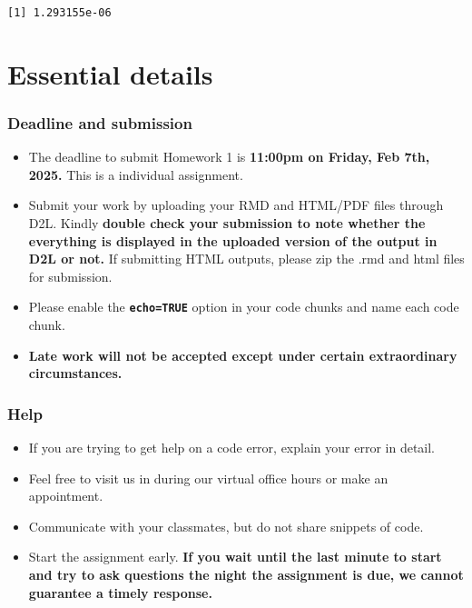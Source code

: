 \documentclass[
]{article}
\begin{document}
\begin{verbatim}
[1] 1.293155e-06
\end{verbatim}

\section{Essential details}\label{essential-details}

\subsubsection{Deadline and submission}\label{deadline-and-submission}

\begin{itemize}
\item
  The deadline to submit Homework 1 is \textbf{11:00pm on Friday, Feb
  7th, 2025.} This is a individual assignment.
\item
  Submit your work by uploading your RMD and HTML/PDF files through D2L.
  Kindly \textbf{double check your submission to note whether the
  everything is displayed in the uploaded version of the output in D2L
  or not.} If submitting HTML outputs, please zip the .rmd and html
  files for submission.
\item
  Please enable the \textbf{\texttt{echo=TRUE}} option in your code
  chunks and name each code chunk.
\item
  \textbf{Late work will not be accepted except under certain
  extraordinary circumstances.}
\end{itemize}

\subsubsection{Help}\label{help}

\begin{itemize}
\item
  If you are trying to get help on a code error, explain your error in
  detail.
\item
  Feel free to visit us in during our virtual office hours or make an
  appointment.
\item
  Communicate with your classmates, but do not share snippets of code.
\item
  Start the assignment early. \textbf{If you wait until the last minute
  to start and try to ask questions the night the assignment is due, we
  cannot guarantee a timely response.}
\end{itemize}
\end{document}
